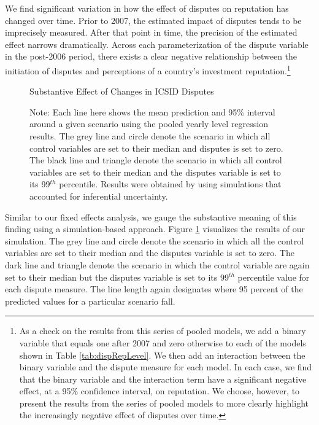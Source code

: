 \documentclass[12pt,onesided]{amsart}
\begin{document}
We find significant variation in how the effect of disputes on reputation has changed over time. Prior to 2007, the estimated impact of disputes tends to be imprecisely measured. After that point in time, the precision of the estimated effect narrows dramatically. Across each parameterization of the dispute variable in the post-2006 period, there exists a clear negative relationship between the initiation of disputes and perceptions of a country's investment reputation.\footnote{As a check on the results from this series of pooled models, we add a binary variable that equals one after 2007 and zero otherwise to each of the models shown in Table \ref{tab:dispRepLevel}. We then add an interaction between the binary variable and the dispute measure for each model. In each case, we find that the binary variable and the interaction term have a significant negative effect, at a 95\% confidence interval, on reputation. We choose, however, to present the results from the series of pooled models to more clearly highlight the increasingly negative effect of disputes over time.} 

\begin{figure}[ht]
	\centering
	\caption{Substantive Effect of Changes in ICSID Disputes}
	\label{fig:dispEffectYearSim}
	\resizebox{1\textwidth}{!}{}
	\caption*{Note: Each line here shows the mean prediction and 95\% interval around a given scenario using the pooled yearly level regression results. The grey line and circle denote the scenario in which all control variables are set to their median and disputes is set to zero. The black line and triangle denote the scenario in which all control variables are set to their median and the disputes variable is set to its 99$^{th}$ percentile. Results were obtained by using simulations that accounted for inferential uncertainty. }
\end{figure}
\FloatBarrier

Similar to our fixed effects analysis, we gauge the substantive meaning of this finding using a simulation-based approach. Figure \ref{fig:dispEffectYearSim} visualizes the results of our simulation. The grey line and circle denote the scenario in which all the control variables are set to their median and the disputes variable is set to zero. The dark line and triangle denote the scenario in which the control variable are again set to their median but the disputes variable is set to its 99$^{th}$ percentile value for each dispute measure. The line length again designates where 95 percent of the predicted values for a particular scenario fall. 
\end{document}

